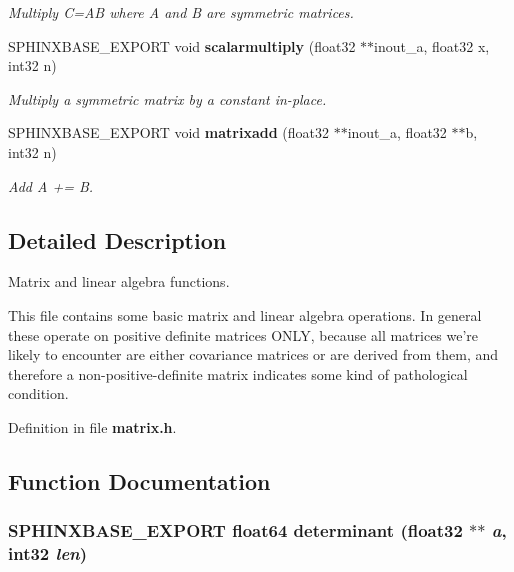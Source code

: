 \begin{CompactItemize}
\begin{CompactList}\small\item\em Multiply C=AB where A and B are symmetric matrices. \item\end{CompactList}\item 
SPHINXBASE\_\-EXPORT void {\bf scalarmultiply} (float32 $\ast$$\ast$inout\_\-a, float32 x, int32 n)
\begin{CompactList}\small\item\em Multiply a symmetric matrix by a constant in-place. \item\end{CompactList}\item 
SPHINXBASE\_\-EXPORT void {\bf matrixadd} (float32 $\ast$$\ast$inout\_\-a, float32 $\ast$$\ast$b, int32 n)
\begin{CompactList}\small\item\em Add A += B. \item\end{CompactList}\end{CompactItemize}


\subsection{Detailed Description}
Matrix and linear algebra functions. 

This file contains some basic matrix and linear algebra operations. In general these operate on positive definite matrices ONLY, because all matrices we're likely to encounter are either covariance matrices or are derived from them, and therefore a non-positive-definite matrix indicates some kind of pathological condition. 

Definition in file {\bf matrix.h}.

\subsection{Function Documentation}
\subsubsection[{determinant}]{\setlength{\rightskip}{0pt plus 5cm}SPHINXBASE\_\-EXPORT float64 determinant (float32 $\ast$$\ast$ {\em a}, \/  int32 {\em len})}\label{matrix_8h_0c810028195f6078c9e99f3b5c29c42b}


